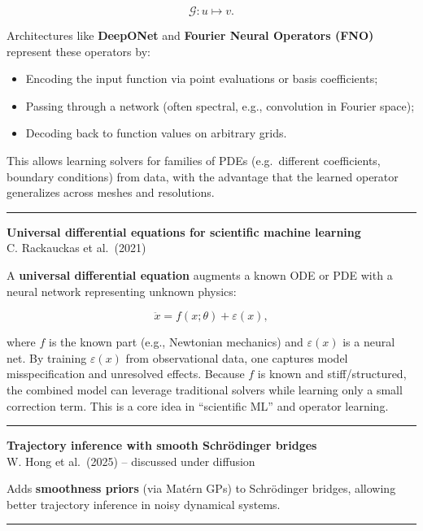 \documentclass[a5paper]{article}
\providecommand{\tightlist}{%
  \setlength{\itemsep}{0pt}\setlength{\parskip}{0pt}}
\begin{document}
\[ \mathcal{G}: u \mapsto v. \]

Architectures like \textbf{DeepONet} and \textbf{Fourier Neural
Operators (FNO)} represent these operators by:

\begin{itemize}
\tightlist
\item
  Encoding the input function via point evaluations or basis
  coefficients;
\item
  Passing through a network (often spectral, e.g., convolution in
  Fourier space);
\item
  Decoding back to function values on arbitrary grids.
\end{itemize}

This allows learning solvers for families of PDEs (e.g.~different
coefficients, boundary conditions) from data, with the advantage that
the learned operator generalizes across meshes and resolutions.

\begin{center}\rule{0.5\linewidth}{0.5pt}\end{center}

\textbf{Universal differential equations for scientific machine
learning}\\
C. Rackauckas et al.~(2021)

A \textbf{universal differential equation} augments a known ODE or PDE
with a neural network representing unknown physics:

\[ \ddot x = f(x;\theta) + \varepsilon(x), \]

where $f$ is the known part (e.g., Newtonian mechanics) and $\varepsilon(x)$ is a
neural net. By training $\varepsilon(x)$ from observational data, one captures model
misspecification and unresolved effects. Because $f$ is known and
stiff/structured, the combined model can leverage traditional solvers
while learning only a small correction term. This is a core idea in
``scientific ML'' and operator learning.

\begin{center}\rule{0.5\linewidth}{0.5pt}\end{center}

\textbf{Trajectory inference with smooth Schrödinger bridges}\\
W. Hong et al.~(2025) -- discussed under diffusion

Adds \textbf{smoothness priors} (via Matérn GPs) to Schrödinger bridges,
allowing better trajectory inference in noisy dynamical systems.

\begin{center}\rule{0.5\linewidth}{0.5pt}\end{center}
\end{document}
